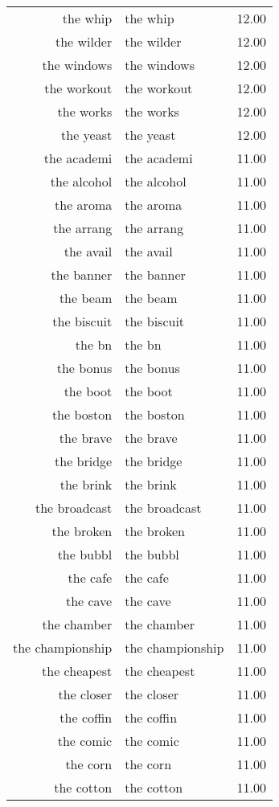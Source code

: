 \begin{table}[ht]
\begin{tabular}{rlr}
  the whip & the whip & 12.00 \\ 
  the wilder & the wilder & 12.00 \\ 
  the windows & the windows & 12.00 \\ 
  the workout & the workout & 12.00 \\ 
  the works & the works & 12.00 \\ 
  the yeast & the yeast & 12.00 \\ 
  the academi & the academi & 11.00 \\ 
  the alcohol & the alcohol & 11.00 \\ 
  the aroma & the aroma & 11.00 \\ 
  the arrang & the arrang & 11.00 \\ 
  the avail & the avail & 11.00 \\ 
  the banner & the banner & 11.00 \\ 
  the beam & the beam & 11.00 \\ 
  the biscuit & the biscuit & 11.00 \\ 
  the bn & the bn & 11.00 \\ 
  the bonus & the bonus & 11.00 \\ 
  the boot & the boot & 11.00 \\ 
  the boston & the boston & 11.00 \\ 
  the brave & the brave & 11.00 \\ 
  the bridge & the bridge & 11.00 \\ 
  the brink & the brink & 11.00 \\ 
  the broadcast & the broadcast & 11.00 \\ 
  the broken & the broken & 11.00 \\ 
  the bubbl & the bubbl & 11.00 \\ 
  the cafe & the cafe & 11.00 \\ 
  the cave & the cave & 11.00 \\ 
  the chamber & the chamber & 11.00 \\ 
  the championship & the championship & 11.00 \\ 
  the cheapest & the cheapest & 11.00 \\ 
  the closer & the closer & 11.00 \\ 
  the coffin & the coffin & 11.00 \\ 
  the comic & the comic & 11.00 \\ 
  the corn & the corn & 11.00 \\ 
  the cotton & the cotton & 11.00 \\ 

\end{tabular}
\end{table}
